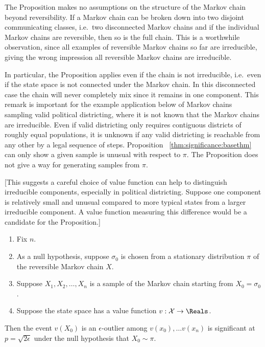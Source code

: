 \documentclass[12pt]{article}
\begin{document}
\begin{remark}
    The Proposition makes no assumptions on the structure of the Markov
    chain beyond reversibility.  If a Markov chain can be broken down
    into two disjoint communicating classes, i.e.\ two disconnected
    Markov chains and if the individual Markov chains are reversible,
    then so is the full chain.  This is a worthwhile observation, since all examples
    of reversible Markov chains so far are irreducible, giving the
    wrong impression all reversible Markov chains are irreducible.

    In particular, the Proposition applies even if the chain is not
    irreducible, i.e.\ even if the state space is not connected under
    the Markov chain.  In this disconnected case the chain will never
    completely mix since it remains in one component.  This remark is
    important for the example application below of Markov chains
    sampling valid political districting, where it is not known that the
    Markov chains are irreducible.  Even if valid districting only
    requires contiguous districts of roughly equal populations, it is
    unknown if any valid districting is reachable from any other by a
    legal sequence of steps.  Proposition~%
    \ref{thm:significance:basethm} can only show a given sample is
    unusual with respect to \( \pi \).  The Proposition does not give a
    way for generating samples from \( \pi \).

    [This suggests a careful choice of value function can help to
    distinguish irreducible components, especially in political
    districting.  Suppose one component is relatively small and unusual
    compared to more typical states from a larger irreducible component.
    A value function measuring this difference would be a candidate for
    the Proposition.]
\end{remark}

\begin{corollary}
    \label{thm:significance:sqrtepstest}
    \begin{enumerate}
        \item
            Fix \( n \).
        \item
            As a null hypothesis, suppose \( \sigma_0 \) is chosen from
            a stationary distribution \( \pi \) of the reversible Markov
            chain \( X \).
        \item
            Suppose \( X_1, X_2, \dots, X_n \) is a sample of the Markov
            chain starting from \( X_0 = \sigma_0 \).
        \item
            Suppose the state space has a value function \( v : \mathcal
            {X} \to \Reals \).
    \end{enumerate}
    Then the event \( v(X_0) \) is an \( \epsilon \)-outlier among \( v(x_0),
    \dots v(x_n ) \) is significant at \( p = \sqrt{2\epsilon} \) under
    the null hypothesis that \( X_0 \sim \pi \).
\end{corollary}
\end{document}
